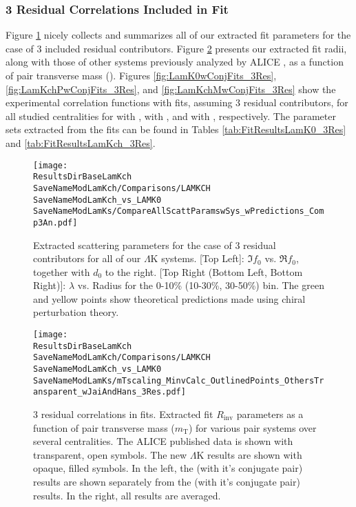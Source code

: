 \documentclass[/home/jesse/Analysis/FemtoAnalysis/AnalysisNotes/AnalysisNoteJBuxton.tex]{subfiles}
\renewcommand{\NonFlatBgdLamKch}{_NonFlatBgdCrctnPolynomial}
\renewcommand{\NonFlatBgdLamKs}{_NonFlatBgdCrctnLinear}
\renewcommand{\ResNum}{_3Res}
\renewcommand{\PrimMaxDecay}{_PrimMaxDecay10fm}
\renewcommand{\SaveNameModLamKch}{\MomRes\NonFlatBgdLamKch\ResNum\PrimMaxDecay\ResMethod\ParamFixAndShareLamKch}
\renewcommand{\SaveNameModLamKs}{\MomRes\NonFlatBgdLamKs\ResNum\PrimMaxDecay\ResMethod\ParamFixAndShareLamKs}
\begin{document}
\subsubsection{3 Residual Correlations Included in Fit}
\label{ResultsLamK_3Res}

Figure \ref{fig:ScattParams_3Res} nicely collects and summarizes all of our extracted fit parameters for the case of 3 included residual contributors.  Figure \ref{fig:mTScalingOfRadii_3Res} presents our extracted fit radii, along with those of other systems previously analyzed by ALICE \cite{Adam:2015vja}, as a function of pair transverse mass (\mt).
Figures \ref{fig:LamK0wConjFits_3Res}, \ref{fig:LamKchPwConjFits_3Res}, and \ref{fig:LamKchMwConjFits_3Res} show the experimental correlation functions with fits, assuming 3 residual contributors, for all studied centralities for \LamKs with \ALamKs, \LamKchP with \ALamKchM, and \LamKchM with \ALamKchP, respectively.
The parameter sets extracted from the fits can be found in Tables \ref{tab:FitResultsLamK0_3Res} and \ref{tab:FitResultsLamKch_3Res}.

\begin{figure}[h]
  \centering
  \texttt{[image: \\ResultsDirBaseLamKch\\SaveNameModLamKch/Comparisons/LAMKCH\\SaveNameModLamKch\_vs\_LAMK0\\SaveNameModLamKs/CompareAllScattParamswSys\_wPredictions\_Comp3An.pdf]}
  \caption[Extracted Scattering Parameters: 3 Residuals in Fit]{Extracted scattering parameters for the case of 3 residual contributors for all of our $\Lambda$K systems.  [Top Left]: $\Im f_{0}$ vs. $\Re f_{0}$, together with $d_{0}$ to the right.  [Top Right (Bottom Left, Bottom Right)]: $\lambda$ vs. Radius for the 0-10\% (10-30\%, 30-50\%) bin.  The green \cite{Liu:2006xja} and yellow \cite{Mai:2009ce} points show theoretical predictions made using chiral perturbation theory.}
  \label{fig:ScattParams_3Res}
\end{figure}


\begin{figure}[h]
  \centering
  \texttt{[image: \\ResultsDirBaseLamKch\\SaveNameModLamKch/Comparisons/LAMKCH\\SaveNameModLamKch\_vs\_LAMK0\\SaveNameModLamKs/mTscaling\_MinvCalc\_OutlinedPoints\_OthersTransparent\_wJaiAndHans\_3Res.pdf]}
  \caption[$m_{\mathrm{T}}$ Scaling of Radii: 3 Residuals in Fit]{3 residual correlations in \LamK fits.  Extracted fit $R_{\mathrm{inv}}$ parameters as a function of pair transverse mass ($m_{\mathrm{T}}$) for various pair systems over several centralities. The ALICE published data \cite{Adam:2015vja} is shown with transparent, open symbols.  The new $\Lambda$K results are shown with opaque, filled symbols.  In the left, the \LamKchP (with it's conjugate pair) results are shown separately from the \LamKchM (with it's conjugate pair) results.  In the right, all \LamKpm results are averaged.}
  \label{fig:mTScalingOfRadii_3Res}
\end{figure}
\end{document}
